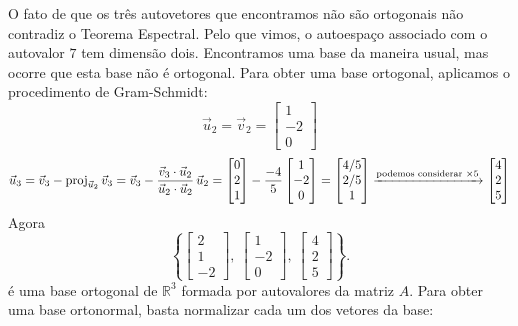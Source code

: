 \documentclass[../livro.tex]{subfiles}
\begin{document}
\begin{example}
	O fato de que os três autovetores que encontramos não são ortogonais não contradiz o Teorema Espectral. Pelo que vimos, o autoespaço associado com o autovalor $7$ tem dimensão dois. Encontramos uma base da maneira usual, mas ocorre que esta base não é ortogonal. Para obter uma base ortogonal, aplicamos o procedimento de Gram-Schmidt:
	\begin{equation}
	\vec{u}_2 = \vec{v}_2 = 
	\begin{bmatrix}
	1 \\ -2 \\ 0
	\end{bmatrix}
	\end{equation}
	\begin{equation}
	\vec{u}_3 = \vec{v}_3 - \operatorname{proj}_{\vec{u}_2} \vec{v}_3 = \vec{v}_3 - \frac{\vec{v}_3 \cdot \vec{u}_2}{\vec{u}_2 \cdot \vec{u}_2} \, \vec{u}_2 = 
	\begin{bmatrix}
	0 \\ 2 \\ 1
	\end{bmatrix} - \frac{-4}{5}
	\begin{bmatrix}
	1 \\ -2 \\ 0
	\end{bmatrix} = 
	\begin{bmatrix}
	4/5 \\ 2/5 \\ 1
	\end{bmatrix} \xrightarrow{\text{podemos considerar } \times 5}
	\begin{bmatrix}
	4 \\ 2 \\ 5
	\end{bmatrix}
	\end{equation} Agora
	\begin{equation}
	\left\lbrace
	\begin{bmatrix}
	2 \\ 1 \\ -2
	\end{bmatrix}, \
	\begin{bmatrix}
	1 \\ -2 \\ 0
	\end{bmatrix}, \
	\begin{bmatrix}
	4 \\ 2 \\ 5
	\end{bmatrix}
	\right\rbrace.
	\end{equation} é uma base ortogonal de $\mathbb{R}^3$ formada por autovalores da matriz $A$. Para obter uma base ortonormal, basta normalizar cada um dos vetores da base:

\end{example}
\end{document}
